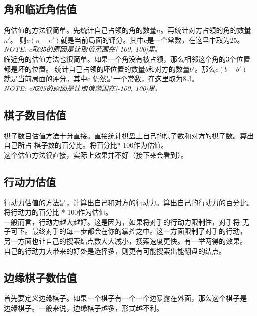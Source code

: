 \documentclass[a4paper]{article}
\begin{document}
\subsection{角和临近角估值}
角估值的方法很简单。先统计自己占领的角的数量$n$。再统计对方占领的角的数量$n'$。 
则$c(n - n')$就是当前局面的评分。其中c是一个常数，在这里中取为25。\\

\emph{NOTE: c取25的原因是让取值范围在[-100, 100]里。}\\

临近角的估值方法也很简单。如果一个角没有被占领，那么相邻这个角的3个位置都是坏的位置。
统计自己占领的坏位置的数量$b$和对方的数量$b'$。那么$c(b - b')$就是当前局面的评分。其中c
仍然是一个常数，在这里取为8.3。\\

\emph{NOTE: c取25的原因是让取值范围在[-100, 100]里。}\\

\subsection{棋子数目估值}
棋子数目估值方法十分直接。直接统计棋盘上自己的棋子数和对方的棋子数。算出自己所占
棋子数的百分比。将百分比* 100作为估值。\\

这个估值方法很直接，实际上效果并不好（接下来会看到）。\\

\subsection{行动力估值}
行动力估值的方法是，计算出自己和对方的行动力。算出自己的行动力的百分比。
将行动力的百分比 * 100作为估值。 \\

一般而言，行动力越大越好。这是因为，如果将对手的行动力限制住，对手将
无子可下。最终对手的每一步都会在你的掌控之中。这一方面限制了对手的行动，
另一方面也让自己的搜索结点数大大减小，搜索速度更快。有一举两得的效果。\\

自己的行动力大带来的好处是选择多，则更有可能搜索出能翻盘的结点。

\subsection{边缘棋子数估值}
首先要定义边缘棋子。如果一个棋子有一个一个边暴露在外面，那么这个棋子是
边缘棋子。一般来说，边缘棋子越多，形式越不利。\\
\end{document}
